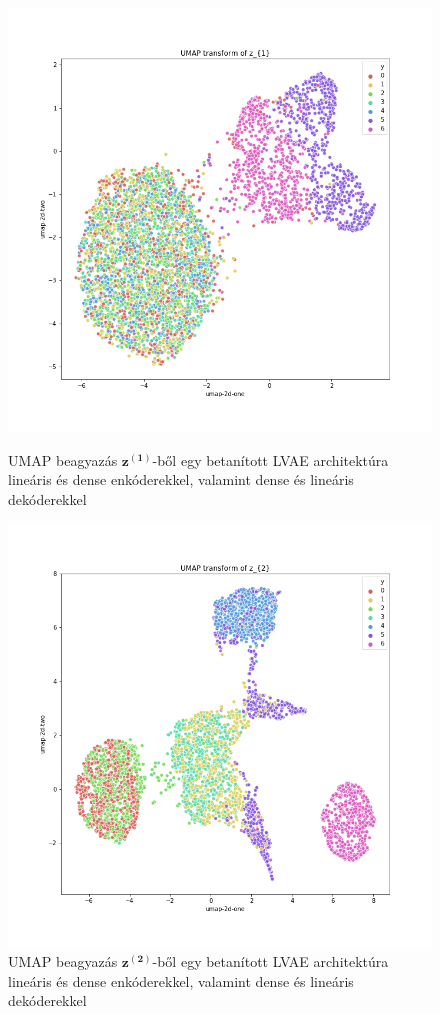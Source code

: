 \documentclass[12pt, english]{article}
\begin{document}
\begin{figure}[H] 
  \begin{minipage}{0.48\linewidth}
    \centering
    \includegraphics[width=.7\linewidth]{umap_z1_dense_lin_lin_no_norm.png}
    \caption{UMAP beagyazás $\bm{z^{(1)}}$-ből egy betanított LVAE architektúra lineáris és dense enkóderekkel, valamint dense és lineáris dekóderekkel}
    \label{fig:umap-z1}
  \end{minipage}\hfill
  \begin{minipage}{0.48\linewidth}
    \centering
    \includegraphics[width=.7\linewidth]{umap_z2_dense_lin_lin_no_norm.png} 
    \caption{UMAP beagyazás $\bm{z^{(2)}}$-ből egy betanított LVAE architektúra lineáris és dense enkóderekkel, valamint dense és lineáris dekóderekkel} 
    \label{fig:umap-z2}
  \end{minipage} 
\end{figure}
\end{document}
